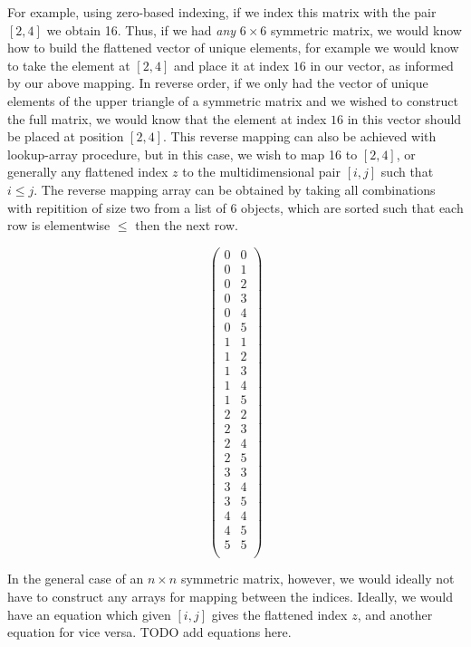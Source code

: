 \documentclass{article}
\begin{document}
For example, using zero-based indexing, if we index this matrix with the pair $[2,4]$ we obtain 16.
Thus, if we had \textit{any} $6 \times 6$ symmetric matrix, we would know how to build the flattened vector of unique elements,
for example we would know to take the element at $[2,4]$ and place it at index $16$ in our vector, as informed by our above mapping.
In reverse order, if we only had the vector of unique elements of the upper triangle of a symmetric matrix and we wished to construct the full matrix,
we would know that the element at index $16$ in this vector should be placed at position $[2,4]$.
This reverse mapping can also be achieved with lookup-array procedure, but in this case, we wish to map 16 to $[2,4]$, or generally any flattened index $z$ to the multidimensional pair $[i,j]$ such that $i \leq j$.
The reverse mapping array can be obtained by taking all combinations with repitition of size two from a list of  6 objects, which are sorted such that each
row is elementwise $\leq$ then the next row.

\begin{equation*}
\begin{pmatrix}
0& 0\\ 
0& 1\\
0& 2\\
0& 3\\
0& 4\\
0& 5\\
1& 1\\
1& 2\\
1& 3\\
1& 4\\
1& 5\\
2& 2\\
2& 3\\
2& 4\\
2& 5\\
3& 3\\
3& 4\\
3& 5\\
4& 4\\
4& 5\\
5& 5\\
\end{pmatrix}
\end{equation*}

In the general case of an $n \times n$ symmetric matrix, however, we would ideally not have to construct any arrays for mapping between the indices. 
Ideally, we would have an equation which given $[i,j]$ gives the flattened index $z$, and another equation for vice versa.
TODO add equations here.
\end{document}
